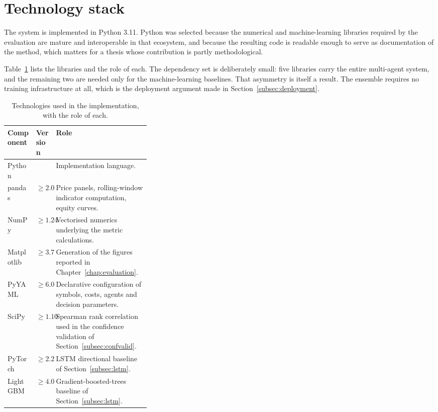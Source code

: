 \section{Technology stack}\label{sec:tech_stack}

The system is implemented in Python 3.11. Python was selected because the numerical and machine-learning libraries required by the evaluation are mature and interoperable in that ecosystem, and because the resulting code is readable enough to serve as documentation of the method, which matters for a thesis whose contribution is partly methodological.

Table~\ref{tab:tech_stack} lists the libraries and the role of each. The dependency set is deliberately small: five libraries carry the entire multi-agent system, and the remaining two are needed only for the machine-learning baselines. That asymmetry is itself a result. The ensemble requires no training infrastructure at all, which is the deployment argument made in Section~\ref{subsec:deployment}.

\begin{table}[!htbp]
\centering
\small
\caption{Technologies used in the implementation, with the role of each.}
\label{tab:tech_stack}
\begin{tabularx}{\linewidth}{@{}>{\raggedright\arraybackslash}p{0.20\linewidth}>{\raggedright\arraybackslash}p{0.13\linewidth}X@{}}
\toprule
\textbf{Component} & \textbf{Version} & \textbf{Role} \\
\midrule
Python & 3.11 & Implementation language. \\
pandas & $\geq 2.0$ & Price panels, rolling-window indicator computation, equity curves. \\
NumPy & $\geq 1.24$ & Vectorised numerics underlying the metric calculations. \\
Matplotlib & $\geq 3.7$ & Generation of the figures reported in Chapter~\ref{chap:evaluation}. \\
PyYAML & $\geq 6.0$ & Declarative configuration of symbols, costs, agents and decision parameters. \\
SciPy & $\geq 1.10$ & Spearman rank correlation used in the confidence validation of Section~\ref{subsec:confvalid}. \\
PyTorch & $\geq 2.2$ & LSTM directional baseline of Section~\ref{subsec:lstm}. \\
LightGBM & $\geq 4.0$ & Gradient-boosted-trees baseline of Section~\ref{subsec:lstm}. \\
\bottomrule
\end{tabularx}
\end{table}

